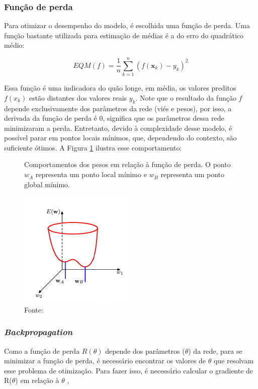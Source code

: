 \subsubsection{Função de perda}

Para otimizar o desempenho do modelo, é escolhida uma função de perda. Uma função bastante utilizada
para estimação de médias é a do erro do quadrático médio:

\[EQM(f) = \frac{1}{n} \sum_{k=1}^{n} (f(\textbf{x}_k) - y_k)^2\]

Essa função é uma indicadora do quão longe, em média, os valores preditos $f(x_k)$ estão distantes dos valores reais $y_k$. 
Note que o resultado da função $f$ depende exclusivamente dos parâmetros da rede (viés e pesos), por isso, 
a derivada da função de perda é 0, significa que  os parâmetros dessa rede minimizaram a perda. Entretanto,
 devido à complexidade desse modelo, é possível parar em pontos locais mínimos, que, dependendo do contexto, são
 suficiente ótimos. A Figura \ref{fig:pesos_lossfunc} ilustra esse comportamento:

\begin{figure}[H]
    \centering
    \caption{Comportamentos dos pesos em relação à função de perda. O ponto $w_A$ representa um ponto local mínimo e $w_B$ representa um ponto global mínimo.}
    \includegraphics[scale=1]{imagens/pesos_loss_func.png}
    \caption*{Fonte: \cite{bishop2006pattern}}
    \label{fig:pesos_lossfunc}
    
\end{figure}

\subsubsection{\textit{Backpropagation}}

Como a função de perda $R(\theta)$ depende dos parâmetros (\textbf{$\theta$}) da rede, para se minimizar
 a função de perda, é necessário encontrar os valores de \textbf{$\theta$} que resolvam 
 esse problema de otimização. Para fazer isso, é necessário calcular o gradiente de  R(\textbf{$\theta$}) em 
 relação à \textbf{$\theta$} \cite{james2013introduction}, 

